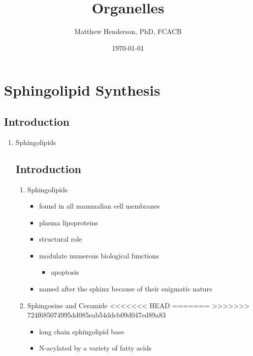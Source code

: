 \documentclass[fontsize=12pt]{scrartcl}
\author{Matthew Henderson, PhD, FCACB}
\date{\today}
\title{Organelles}
\begin{document}
\maketitle
\tableofcontents


\section{Sphingolipid Synthesis}
\label{sec:org5dce1b4}
\subsection{Introduction}
\label{sec:org4bc9412}
\begin{enumerate}
\item Sphingolipids
\label{sec:orgf1f23a8}
\label{sec:org8631394}
\subsection{Introduction}
\label{sec:orga8a4f37}
\begin{enumerate}
\item Sphingolipids
\label{sec:org732579c}
\begin{itemize}
\item found in all mammalian cell membranes
\item plasma lipoproteins
\item structural role
\item modulate numerous biological functions
\begin{itemize}
\item apoptosis
\end{itemize}
\item named after the sphinx because of their enigmatic nature
\end{itemize}

\item Sphingosine and Ceramide
<<<<<<< HEAD
\label{sec:org707d443}
=======
\label{sec:org996dffe}
>>>>>>> 724f685074995dd085eab54ddeb09d047ed89a83
\begin{itemize}
\item long chain sphingolipid base
\item N-acylated by a variety of fatty acids
\end{itemize}



\end{enumerate}
\end{enumerate}
\end{document}
